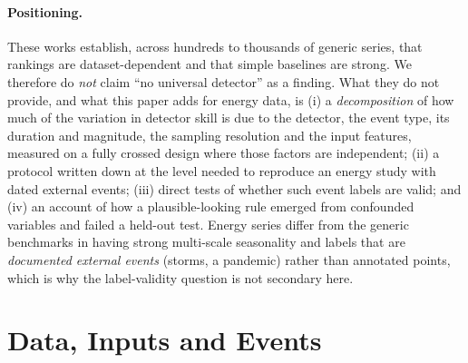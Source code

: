 \documentclass[10pt,twocolumn]{article}
\begin{document}
\paragraph{Positioning.} These works establish, across hundreds to thousands of generic series, that rankings are dataset-dependent and that simple baselines are strong. We therefore do \emph{not} claim ``no universal detector'' as a finding. What they do not provide, and what this paper adds for energy data, is (i) a \emph{decomposition} of how much of the variation in detector skill is due to the detector, the event type, its duration and magnitude, the sampling resolution and the input features, measured on a fully crossed design where those factors are independent; (ii) a protocol written down at the level needed to reproduce an energy study with dated external events; (iii) direct tests of whether such event labels are valid; and (iv) an account of how a plausible-looking rule emerged from confounded variables and failed a held-out test. Energy series differ from the generic benchmarks in having strong multi-scale seasonality and labels that are \emph{documented external events} (storms, a pandemic) rather than annotated points, which is why the label-validity question is not secondary here.

\section{Data, Inputs and Events}\label{sec:data}
\end{document}

